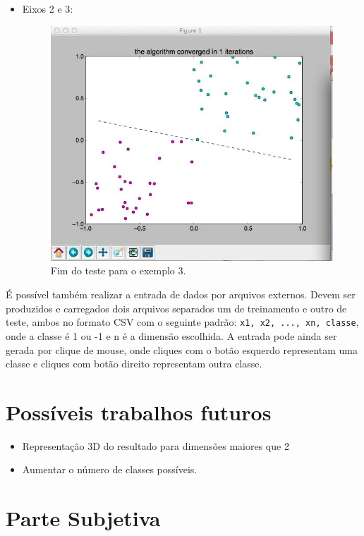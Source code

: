 \documentclass[brazil, a4paper]{article}
\begin{document}
\begin{description}
\begin{itemize}
\item Eixos 2 e 3:
\begin{figure}[!htb]
\centering
\includegraphics[scale=0.4]{eixo23.jpg}
\caption{Fim do teste para o exemplo 3.}
\end{figure}
\end{itemize}

É possível também realizar a entrada de dados por arquivos externos. Devem ser produzidos e carregados dois arquivos separados um de treinamento e outro de teste, ambos no formato CSV com o seguinte padrão: \texttt{x1, x2, ..., xn, classe}, onde a classe é 1 ou -1 e n é a dimensão escolhida. A entrada pode ainda ser gerada por clique de mouse, onde cliques com o botão esquerdo representam uma classe e cliques com botão direito representam outra classe.
\end{description} 


\section{Possíveis trabalhos futuros}

\begin{itemize}
\item Representação 3D do resultado para dimensões maiores que 2
\item Aumentar o número de classes possíveis.
\end{itemize}  


\section{Parte Subjetiva}
\end{document}
